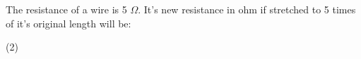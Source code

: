 \item The resistance of a wire is 5 $\Omega$. It's new resistance in ohm if stretched to 5 times of it's original length will be:
    \begin{tasks}(2)
    \end{tasks}